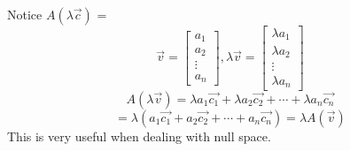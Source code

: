 \documentclass[oneside]{book}
\begin{document}
Notice $A (\lambda \vec{c})$ = 
\[
    \vec{v} = \begin{bmatrix}
        a_1\\
        a_2\\
        \vdots\\
        a_n
    \end{bmatrix}
, \lambda \vec{v} = \begin{bmatrix}
    \lambda a_1\\
    \lambda a_2\\
    \vdots\\
    \lambda a_n
\end{bmatrix}
\]
\[
    A(\lambda \vec{v}) = \lambda a_1 \vec{c_1} + \lambda a_2 \vec{c_2} + \cdots + \lambda a_n \vec{c_n}    
\]
\[
    = \lambda (a_1 \vec{c_1} + a_2 \vec{c_2} + \cdots + a_n \vec{c_n})= \lambda A(\vec{v})
\]
This is very useful when dealing with null space. 
\end{document}
